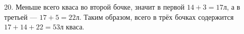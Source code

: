 20. Меньше всего кваса во второй бочке, значит в первой $14+3=17$л, а в третьей --- $17+5=22$л. Таким образом, всего в трёх бочках содержится $17+14+22=53$л кваса.\\
